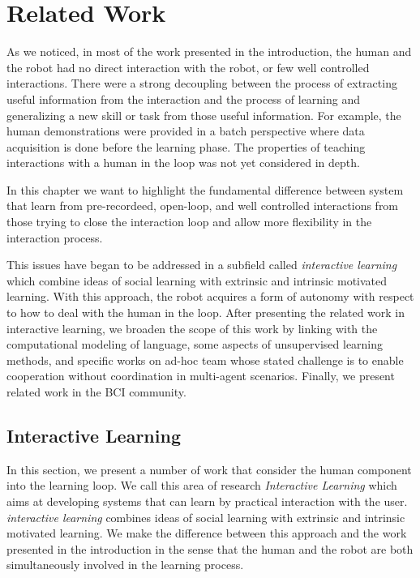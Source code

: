 
\chapter{Related Work}
\label{chapter:relatedwork}
\minitoc


As we noticed, in most of the work presented in the introduction, the human and the robot had no direct interaction with the robot, or few well controlled interactions. There were a strong decoupling between the process of extracting useful information from the interaction and the process of learning and generalizing a new skill or task from those useful information. For example, the human demonstrations were provided in a batch perspective where data acquisition is done before the learning phase. The properties of teaching interactions with a human in the loop was not yet considered in depth. 

In this chapter we want to highlight the fundamental difference between system that learn from pre-recordeed, open-loop, and well controlled interactions from those trying to close the interaction loop and allow more flexibility in the interaction process.

This issues have began to be addressed in a subfield called \emph{interactive learning}  which combine ideas of social learning with extrinsic and intrinsic motivated learning. With  this approach, the robot acquires a form of autonomy with respect to how to deal with the human in the loop. After presenting the related work in interactive learning, we broaden the scope of this work by linking with the computational modeling of language, some aspects of unsupervised learning methods, and specific works on ad-hoc team whose stated challenge is to enable cooperation without coordination in multi-agent scenarios. Finally, we present related work in the BCI community.

\section{Interactive Learning}

In this section, we present a number of work that consider the human component into the learning loop. We call this area of research \emph{Interactive Learning} \cite{nicolescu2003natural,breazeal2004tutelage} which aims at developing systems that can learn by practical interaction with the user. \textit{interactive learning} combines ideas of social learning with extrinsic and intrinsic motivated learning. We make the difference between this approach and the work presented in the introduction in the sense that the human and the robot are both simultaneously involved in the learning process.

